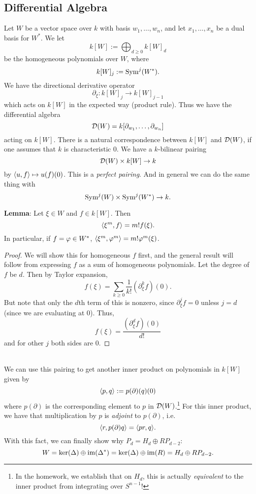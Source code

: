 \documentclass{amsart}
\begin{document}
\subsection{Differential Algebra}

Let $W$ be a vector space over $k$ with basis $w_1,\dots,w_n$, and let $x_1,\dots,x_n$ be a dual basis for $W^*$. We let
$$
k[W] := \bigoplus_{d\geq 0} k[W]_d
$$
be the homogeneous polynomials over $W$, where 
$$
k[W]_j := \operatorname{Sym}^j(W^*).
$$
We have the directional derivative operator
$$
\partial_{\xi} : k[W]_j \to k[W]_{j-1}
$$
which acts on $k[W]$ in the expected way (product rule). Thus we have the differential algebra
$$
\mathcal{D}(W) = k[\partial_{w_1},\dots,\partial_{w_n}]
$$
acting on $k[W]$. There is a natural correspondence between $k[W]$ and $\mathcal{D}(W)$, if one assumes that $k$ is characteristic 0. We have a $k$-bilinear pairing 
$$
\mathcal{D}(W) \times k[W] \to k
$$
by $\langle u,f\rangle\mapsto u(f)(0)$. This is a \textit{perfect pairing}. And in general we can do the same thing with 
$$
\operatorname{Sym}^j(W)\times \operatorname{Sym}^j(W^*)\to k.
$$

\noindent \textbf{Lemma}: Let $\xi\in W$ and $f\in k[W]$. Then
$$\langle\xi^m,f\rangle = m!f(\xi).$$
In particular, if $f=\varphi\in W^*$, $\langle\xi^m,\varphi^m\rangle=m!\varphi^m(\xi)$.
\begin{proof}
	We will show this for homogeneous $f$ first, and the general result will follow from expressing $f$ as a sum of homogeneous polynomials. Let the degree of $f$ be $d$. Then by Taylor expansion,
	$$f(\xi) = \sum_{k\geq 0} \frac{1}{k!}(\partial_{\xi}^kf)(0).$$
	But note that only the $d$th term of this is nonzero, since $\partial^j_{\xi}f= 0$ unless $j=d$ (since we are evaluating at $0$). Thus,
	$$
	f(\xi) = \frac{(\partial^d_{\xi}f)(0)}{d!}
	$$
	and for other $j$ both sides are 0.
\end{proof}\\

We can use this pairing to get another inner product on polynomials in $k[W]$ given by
$$
\langle p,q\rangle := p(\partial)(q)(0)
$$
where $p(\partial)$ is the corresponding element to $p$ in $\mathcal{D}(W)$.\footnote{In the homework, we establish that on $H_d$, this is actually \textit{equivalent} to the inner product from integrating over $S^{n-1}$!} For this inner product, we have that multiplication by $p$ is \textit{adjoint} to $p(\partial)$, i.e.
$$
\langle r,p(\partial)q\rangle = \langle pr,q\rangle.
$$
With this fact, we can finally show why $P_d = H_d \oplus R P_{d-2}$:
$$
W = \ker(\Delta) \oplus \operatorname{im}(\Delta^*) = \ker(\Delta) \oplus \operatorname{im}(R) = H_d \oplus R P_{d-2}.
$$
\end{document}
